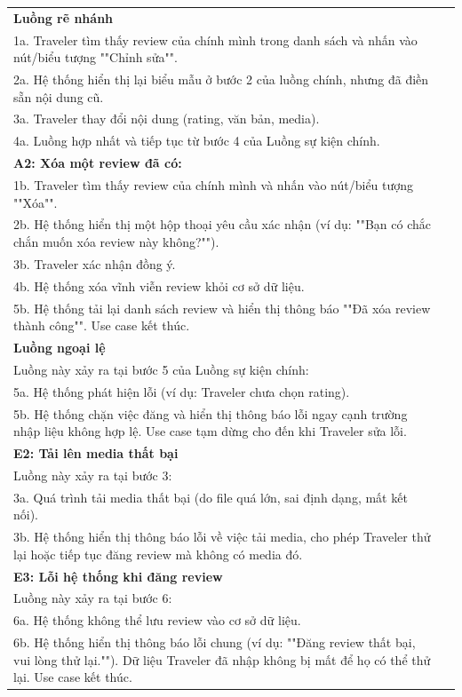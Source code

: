 \begin{longtable}{@{}p{4cm} p{11cm}@{}}
\textbf{Luồng rẽ nhánh} &
\begin{tabular}[t]{@{}p{10.5cm}@{}}
\textbf{A1: Chỉnh sửa một review đã có:}\\
1a. Traveler tìm thấy review của chính mình trong danh sách và nhấn vào nút/biểu tượng ""Chỉnh sửa"".\\
2a. Hệ thống hiển thị lại biểu mẫu ở bước 2 của luồng chính, nhưng đã điền sẵn nội dung cũ.\\
3a. Traveler thay đổi nội dung (rating, văn bản, media).\\
4a. Luồng hợp nhất và tiếp tục từ bước 4 của Luồng sự kiện chính.\\
\textbf{A2: Xóa một review đã có:}\\
1b. Traveler tìm thấy review của chính mình và nhấn vào nút/biểu tượng ""Xóa"".\\
2b. Hệ thống hiển thị một hộp thoại yêu cầu xác nhận (ví dụ: ""Bạn có chắc chắn muốn xóa review này không?"").\\
3b. Traveler xác nhận đồng ý.\\
4b. Hệ thống xóa vĩnh viễn review khỏi cơ sở dữ liệu.\\
5b. Hệ thống tải lại danh sách review và hiển thị thông báo ""Đã xóa review thành công"". Use case kết thúc.
\end{tabular} \\ \midrule
\textbf{Luồng ngoại lệ} &
\begin{tabular}[t]{@{}p{10.5cm}@{}}
\textbf{E1: Dữ liệu nhập không hợp lệ}\\
Luồng này xảy ra tại bước 5 của Luồng sự kiện chính:\\
5a. Hệ thống phát hiện lỗi (ví dụ: Traveler chưa chọn rating).\\
5b. Hệ thống chặn việc đăng và hiển thị thông báo lỗi ngay cạnh trường nhập liệu không hợp lệ. Use case tạm dừng cho đến khi Traveler sửa lỗi.\\[3pt]
\textbf{E2: Tải lên media thất bại}\\
Luồng này xảy ra tại bước 3:\\
3a. Quá trình tải media thất bại (do file quá lớn, sai định dạng, mất kết nối).\\
3b. Hệ thống hiển thị thông báo lỗi về việc tải media, cho phép Traveler thử lại hoặc tiếp tục đăng review mà không có media đó.\\[3pt]
\textbf{E3: Lỗi hệ thống khi đăng review}\\
Luồng này xảy ra tại bước 6:\\
6a. Hệ thống không thể lưu review vào cơ sở dữ liệu.\\
6b. Hệ thống hiển thị thông báo lỗi chung (ví dụ: ""Đăng review thất bại, vui lòng thử lại.""). Dữ liệu Traveler đã nhập không bị mất để họ có thể thử lại. Use case kết thúc.
\end{tabular} \\ 
\bottomrule
\end{longtable}

